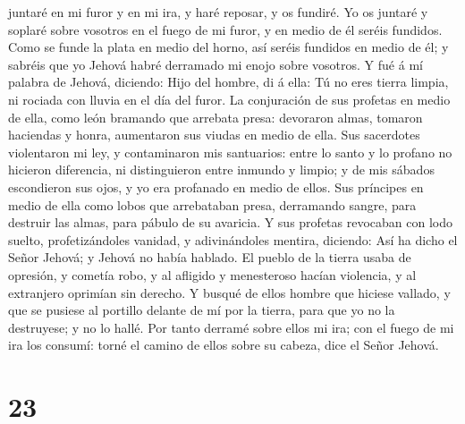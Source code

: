 juntaré en mi furor y en mi ira, y haré reposar, y os fundiré.
 Yo os juntaré y soplaré sobre vosotros en el fuego de mi
furor, y en medio de él seréis fundidos.  Como se funde la
plata en medio del horno, así seréis fundidos en medio de él; y sabréis
que yo Jehová habré derramado mi enojo sobre vosotros.  Y
fué á mí palabra de Jehová, diciendo:  Hijo del hombre, di
á ella: Tú no eres tierra limpia, ni rociada con lluvia en el día del
furor.  La conjuración de sus profetas en medio de ella,
como león bramando que arrebata presa: devoraron almas, tomaron
haciendas y honra, aumentaron sus viudas en medio de ella. 
Sus sacerdotes violentaron mi ley, y contaminaron mis santuarios: entre
lo santo y lo profano no hicieron diferencia, ni distinguieron entre
inmundo y limpio; y de mis sábados escondieron sus ojos, y yo era
profanado en medio de ellos.  Sus príncipes en medio de
ella como lobos que arrebataban presa, derramando sangre, para destruir
las almas, para pábulo de su avaricia.  Y sus profetas
revocaban con lodo suelto, profetizándoles vanidad, y adivinándoles
mentira, diciendo: Así ha dicho el Señor Jehová; y Jehová no había
hablado.  El pueblo de la tierra usaba de opresión, y
cometía robo, y al afligido y menesteroso hacían violencia, y al
extranjero oprimían sin derecho.  Y busqué de ellos hombre
que hiciese vallado, y que se pusiese al portillo delante de mí por la
tierra, para que yo no la destruyese; y no lo hallé.  Por
tanto derramé sobre ellos mi ira; con el fuego de mi ira los consumí:
torné el camino de ellos sobre su cabeza, dice el Señor Jehová.

\hypertarget{section-22}{%
\section{23}\label{section-22}}

